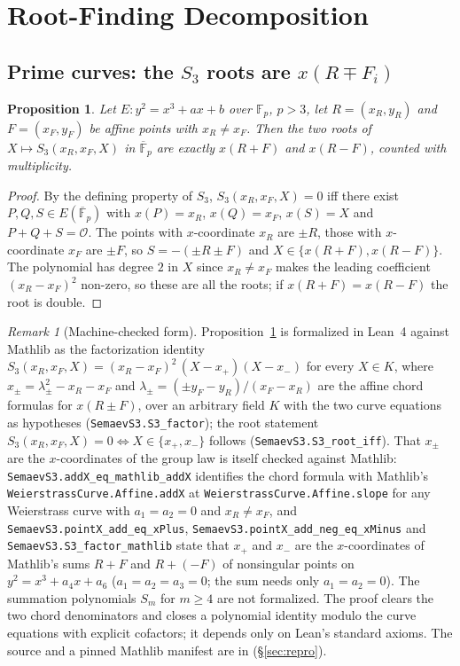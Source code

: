 \documentclass[10pt,a4paper]{article}
\newtheorem{proposition}{Proposition}
\theoremstyle{remark}
\newtheorem{remark}{Remark}
\newcommand{\FF}{\mathbb{F}}
\newcommand{\Sem}[1]{S_{#1}}
\newcommand{\code}[1]{\texttt{#1}}
\begin{document}
\section{Root-Finding Decomposition}
\label{sec:algorithms}

\subsection{Prime curves: the $\Sem{3}$ roots are $x(R \mp F_i)$}

\begin{proposition}
\label{prop:s3roots}
Let $E: y^2 = x^3 + ax + b$ over $\FF_p$, $p > 3$, let $R = (x_R, y_R)$
and $F = (x_F, y_F)$ be affine points with $x_R \neq x_F$. Then the two
roots of $X \mapsto \Sem{3}(x_R, x_F, X)$ in $\overline{\FF}_p$ are
exactly $x(R + F)$ and $x(R - F)$, counted with multiplicity.
\end{proposition}

\begin{proof}
By the defining property of $\Sem{3}$, $\Sem{3}(x_R, x_F, X) = 0$ iff
there exist $P, Q, S \in E(\overline{\FF}_p)$ with $x(P) = x_R$,
$x(Q) = x_F$, $x(S) = X$ and $P + Q + S = \mathcal{O}$. The points with
$x$-coordinate $x_R$ are $\pm R$, those with $x$-coordinate $x_F$ are
$\pm F$, so $S = -(\pm R \pm F)$ and $X \in \{x(R+F), x(R-F)\}$. The
polynomial has degree $2$ in $X$ since $x_R \neq x_F$ makes the leading
coefficient $(x_R - x_F)^2$ non-zero, so these are all the roots; if
$x(R+F) = x(R-F)$ the root is double.
\end{proof}

\begin{remark}[Machine-checked form]
\label{rem:lean}
Proposition~\ref{prop:s3roots} is formalized in Lean~4 against Mathlib
as the factorization identity
$\Sem{3}(x_R, x_F, X) = (x_R - x_F)^2\,(X - x_+)(X - x_-)$ for every
$X \in K$, where $x_\pm = \lambda_\pm^2 - x_R - x_F$ and
$\lambda_\pm = (\pm y_F - y_R)/(x_F - x_R)$ are the affine chord formulas
for $x(R \pm F)$, over an arbitrary field $K$ with the two curve equations
as hypotheses (\code{SemaevS3.S3\_factor}); the root statement
$\Sem{3}(x_R,x_F,X) = 0 \iff X \in \{x_+, x_-\}$ follows
(\code{SemaevS3.S3\_root\_iff}). That $x_\pm$ are the
$x$-coordinates of the group law is itself checked against Mathlib:
\code{SemaevS3.addX\_eq\_mathlib\_addX} identifies the chord formula with
Mathlib's \code{WeierstrassCurve.Affine.addX} at
\code{WeierstrassCurve.Affine.slope} for any Weierstrass curve with
$a_1 = a_2 = 0$ and $x_R \ne x_F$, and \code{SemaevS3.pointX\_add\_eq\_xPlus},
\code{SemaevS3.pointX\_add\_neg\_eq\_xMinus} and
\code{SemaevS3.S3\_factor\_mathlib} state that $x_+$ and $x_-$ are the
$x$-coordinates of Mathlib's sums $R + F$ and $R + (-F)$ of nonsingular
points on $y^2 = x^3 + a_4x + a_6$ ($a_1 = a_2 = a_3 = 0$; the sum needs
only $a_1 = a_2 = 0$). The summation polynomials $\Sem{m}$ for $m \ge 4$
are not formalized. The proof clears the two chord
denominators and closes a polynomial identity modulo the curve equations
with explicit cofactors; it depends only on Lean's standard axioms. The
source and a pinned Mathlib manifest are in
 (\S\ref{sec:repro}).
\end{remark}
\end{document}
